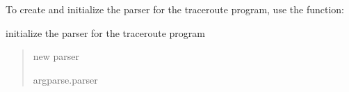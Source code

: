 \documentclass[letterpaper,10pt,english,openany,oneside]{sphinxmanual}
\begin{document}
\sphinxAtStartPar
To create and initialize the parser for the traceroute program,
use the  function:

\begin{fulllineitems}
\label{\detokenize{index:my_traceroute.initialize_parser}}
\pysigstartsignatures
\pysiglinewithargsret
{}
{}
{}
\pysigstopsignatures
\sphinxAtStartPar
initialize the parser for the traceroute program
\begin{quote}\begin{description}
\sphinxAtStartPar
new parser

\sphinxAtStartPar
argparse.parser

\end{description}\end{quote}

\end{fulllineitems}




\renewcommand{\indexname}{Index}
\printindex
\end{document}
